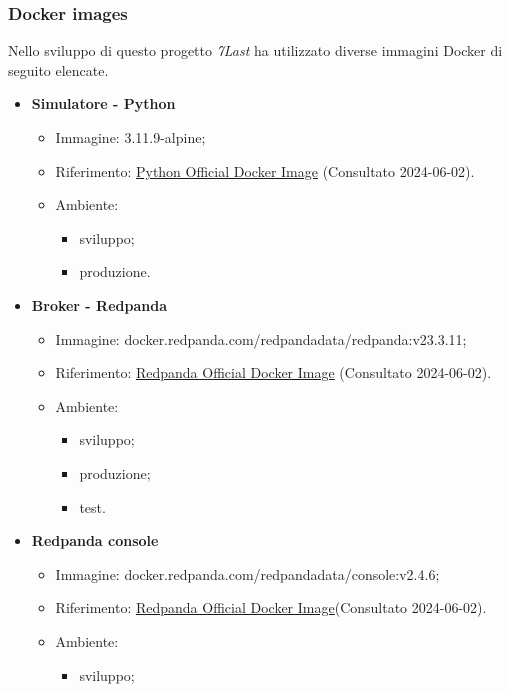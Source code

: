 \subsubsection{Docker images}
Nello sviluppo di questo progetto \textit{7Last} ha utilizzato diverse immagini Docker di seguito elencate.
\begin{itemize}
    \item \textbf{Simulatore - Python}
    \begin{itemize}
        \item Immagine: 3.11.9-alpine;
        \item Riferimento: \href{https://hub.docker.com/_/python}{Python Official Docker Image} (Consultato 2024-06-02).
        \item Ambiente: 
        \begin{itemize}
            \item sviluppo;
            \item produzione.
        \end{itemize}
    \end{itemize}
    \item \textbf{Broker - Redpanda}
    \begin{itemize}
        \item Immagine: docker.redpanda.com/redpandadata/redpanda:v23.3.11;
        \item Riferimento: \href{https://hub.docker.com/r/redpandadata/redpanda}{Redpanda Official Docker Image} (Consultato 2024-06-02).
        \item Ambiente: 
        \begin{itemize}
            \item sviluppo;
            \item produzione;
            \item test.
        \end{itemize}
    \end{itemize}
    \item \textbf{Redpanda console}
    \begin{itemize}
        \item Immagine: docker.redpanda.com/redpandadata/console:v2.4.6;
        \item Riferimento: \href{https://hub.docker.com/r/redpandadata/redpanda}{Redpanda Official Docker Image}(Consultato 2024-06-02).
        \item Ambiente: 
        \begin{itemize}
            \item sviluppo;

\end{itemize}
\end{itemize}
\end{itemize}
